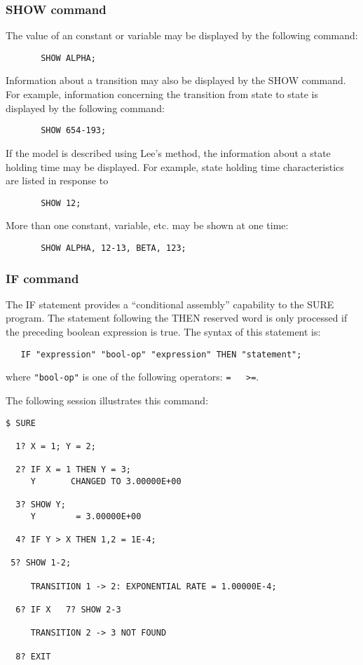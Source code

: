 \subsubsection{SHOW command} The value
of an constant or variable may be displayed by the following command:
\begin{verbatim}
       SHOW ALPHA;
\end{verbatim}
Information about a transition may also be displayed by the {\isf SHOW}
command.  For example, information concerning the transition from state {} to state {} is displayed by the following command:
\begin{verbatim}
       SHOW 654-193;
\end{verbatim}
If the model is described using Lee's method, the information about a state
holding time may be displayed.  For example, state {} holding time
characteristics are listed in response to
\begin{verbatim}
       SHOW 12;
\end{verbatim}
More than one constant, variable, etc. may be shown at one time:
\begin{verbatim}
       SHOW ALPHA, 12-13, BETA, 123;
\end{verbatim}
\subsubsection{IF command} The IF statement provides a ``conditional 
assembly'' capability to the SURE program.  The statement following the {\isf
THEN reserved} word is only processed if the preceding boolean expression is
true.  The syntax of this statement is:
\begin{verbatim}
   IF "expression" "bool-op" "expression" THEN "statement";
\end{verbatim}
where \verb|"bool-op"| is one of the following operators: \verb|=   >=|. 

The following session illustrates this command:
\begin{verbatim}
$ SURE

  1? X = 1; Y = 2;

  2? IF X = 1 THEN Y = 3;
     Y       CHANGED TO 3.00000E+00

  3? SHOW Y;
     Y        = 3.00000E+00 

  4? IF Y > X THEN 1,2 = 1E-4;
 
 5? SHOW 1-2;

     TRANSITION 1 -> 2: EXPONENTIAL RATE = 1.00000E-4;

  6? IF X   7? SHOW 2-3

     TRANSITION 2 -> 3 NOT FOUND

  8? EXIT
\end{verbatim}

